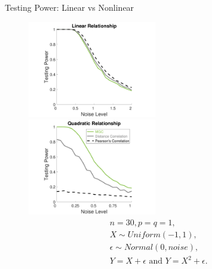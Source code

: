 \documentclass[mathserif,t]{beamer}
\newcommand{\Mgc}{MGC}
\begin{document}
\begin{frame}{Testing Power: Linear vs Nonlinear}
\pause
\begin{figure}[!ht]
\centering
\includegraphics[width=0.5\textwidth,trim={1.5cm 0 0cm 0cm},clip]{FigNoiseT1}
\includegraphics[width=0.5\textwidth,trim={1.5cm 0 0cm 0cm},clip]{FigNoiseT6}
\label{f:noise}
\begin{align*}
& n=30, p=q=1, \\
& X \sim Uniform(-1,1),\\
& \epsilon \sim Normal(0, noise), \\
& Y=X+\epsilon \mbox{ and } Y=X^{2}+\epsilon.
\end{align*}
\end{figure}
\end{frame}

\end{document}
